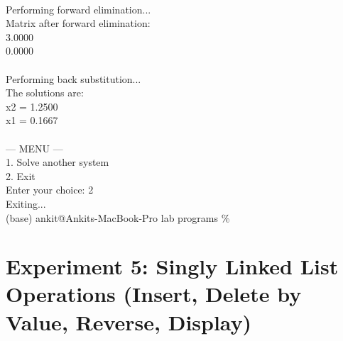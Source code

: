 \documentclass[12pt,a4paper]{article}
\begin{document}
\begin{tcolorbox}[terminalstyle, title=Sample Output]
{\\
Performing forward elimination...\\
Matrix after forward elimination:\\
3.0000  \\
0.0000  \\
\\
Performing back substitution...\\
The solutions are:\\
x2 = 1.2500\\
x1 = 0.1667\\
\\
--- MENU ---\\
1. Solve another system\\
2. Exit\\
Enter your choice: 2\\
Exiting...\\
(base) ankit@Ankits-MacBook-Pro lab programs \%
}
\end{tcolorbox}



\newpage
\section*{Experiment 5: Singly Linked List Operations (Insert, Delete by Value, Reverse, Display)}
\end{document}
